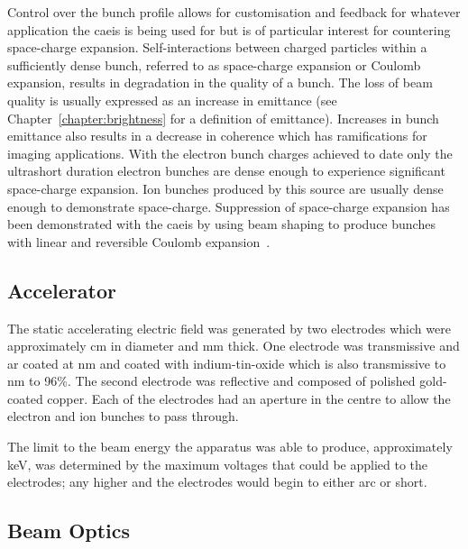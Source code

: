 Control over the bunch profile allows for customisation and feedback for whatever application the \gls{caeis} is being used for but is of particular interest for countering space-charge expansion.
Self-interactions between charged particles within a sufficiently dense bunch, referred to as space-charge expansion or Coulomb expansion, results in degradation in the quality of a bunch.
The loss of beam quality is usually expressed as an increase in emittance (see Chapter~\ref{chapter:brightness} for a definition of emittance).
Increases in bunch emittance also results in a decrease in coherence which has ramifications for imaging applications.
With the electron bunch charges achieved to date only the ultrashort duration electron bunches are dense enough to experience significant space-charge expansion.
Ion bunches produced by this source are usually dense enough to demonstrate space-charge.
Suppression of space-charge expansion has been demonstrated with the \gls{caeis} by using beam shaping to produce bunches with linear and reversible Coulomb expansion~\cite{luiten_how_2004,thompson_suppression_2016}.

\subsection{Accelerator}

The static accelerating electric field was generated by two electrodes which were approximately \unit[11]{cm} in diameter and \unit[4]{mm} thick.
One electrode was transmissive and \gls{ar} coated at \unit[780]{nm} and coated with indium-tin-oxide which is also transmissive to \unit[780]{nm} to 96\%.
The second electrode was reflective and composed of polished gold-coated copper.
Each of the electrodes had an aperture in the centre to allow the electron and ion bunches to pass through.

The limit to the beam energy the apparatus was able to produce, approximately \unit[12]{keV}, was determined by the maximum voltages that could be applied to the electrodes; any higher and the electrodes would begin to either arc or short.

\subsection{Beam Optics}

